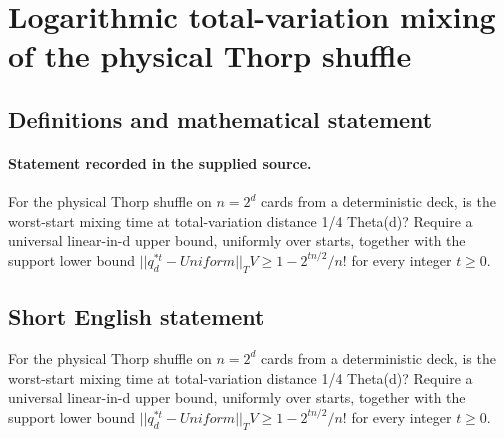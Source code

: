 \documentclass[11pt]{article}
\begin{document}
\section*{Logarithmic total-variation mixing of the physical Thorp shuffle}\label{30007400}
\subsection{Definitions and mathematical statement}
\paragraph{Statement recorded in the supplied source.}
For the physical Thorp shuffle on $n=2^d$ cards from a deterministic deck, is the worst-start mixing time at total-variation distance 1/4 Theta(d)? Require a universal linear-in-d upper bound, uniformly over starts, together with the support lower bound $||q_d^{*t}-Uniform||_TV\geq 1-2^{tn/2}/n!$ for every integer $t\geq 0$.
\subsection{Short English statement}
For the physical Thorp shuffle on $n=2^d$ cards from a deterministic deck, is the worst-start mixing time at total-variation distance 1/4 Theta(d)? Require a universal linear-in-d upper bound, uniformly over starts, together with the support lower bound $||q_d^{*t}-Uniform||_TV\geq 1-2^{tn/2}/n!$ for every integer $t\geq 0$.
\end{document}

